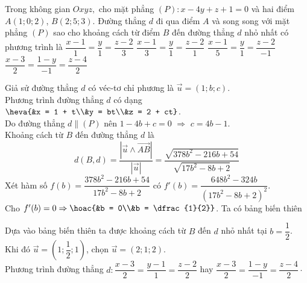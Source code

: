 \begin{ex}%
Trong không gian $ Oxyz, $	cho mặt phẳng $ (P) \colon x - 4y + z + 1 = 0 $ và hai điểm $ A(1;0;2) $, $ B(2;5;3) $. Đường thẳng $ d $ đi qua điểm $ A $ và song song với mặt phẳng $ (P) $ sao cho khoảng cách từ điểm $ B $ đến đường thẳng $ d $ nhỏ nhất có phương trình là
	\choice
	{$ \dfrac{x-1}{1} = \dfrac{y}{1} = \dfrac{z-2}{3} $}
	{$ \dfrac{x-1}{3} = \dfrac{y}{1} = \dfrac{z-2}{1} $}
	{$ \dfrac{x-1}{5} = \dfrac{y}{1} = \dfrac{z-2}{-1} $}
	{\True $ \dfrac{x-3}{2} = \dfrac{1-y}{-1} = \dfrac{z-4}{2} $}
	\loigiai
{
Giả sử đường thẳng $ d $ có véc-tơ chỉ phương là $ \vec{u} = (1;b;c) $.\\
Phương trình đường thẳng $ d $ có dạng $ \heva{&x = 1 + t\\&y = bt\\&z = 2 + ct} $.\\
Do đường thẳng $ d \parallel (P) $ nên $ 1 - 4b + c = 0$ $\Rightarrow$ $c = 4b -1 $.\\
Khoảng cách từ $ B  $ đến đường thẳng $ d $ là 
$$ d\left(B,d\right) = \dfrac{\left|\vec{u} \wedge \vec{AB}  \right|}{\left|\vec{u}\right|} = \dfrac{\sqrt{378b^2 - 216b + 54}}{\sqrt{17b^2 - 8b + 2}} $$
Xét hàm số $ f(b) = \dfrac{378b^2 - 216b + 54}{17b^2 - 8b + 2} $ có $ f'(b) = \dfrac{648b^2 - 324b}{\left(17b^2 - 8b + 2\right)^2} $. \\
Cho $ f'(b) = 0 \Rightarrow \hoac{&b = 0\\&b = \dfrac{1}{2}} $. Ta có bảng biến thiên
\begin{center}
\end{center}
Dựa vào bảng biến thiên ta được khoảng cách từ $ B $ đến $ d $ nhỏ nhất tại $ b = \dfrac{1}{2} $.\\
Khi đó $ \vec{u} = \left(1;\dfrac{1}{2}; 1\right) $, chọn $ \vec{u} = (2;1;2) $.\\
Phương trình đường thẳng $ d: \dfrac{x-3}{2} = \dfrac{y - 1}{1} = \dfrac{z-2}{2}  $ hay $ \dfrac{x-3}{2} = \dfrac{1-y}{-1} = \dfrac{z-4}{2}  \cdot $
} 
\end{ex}
